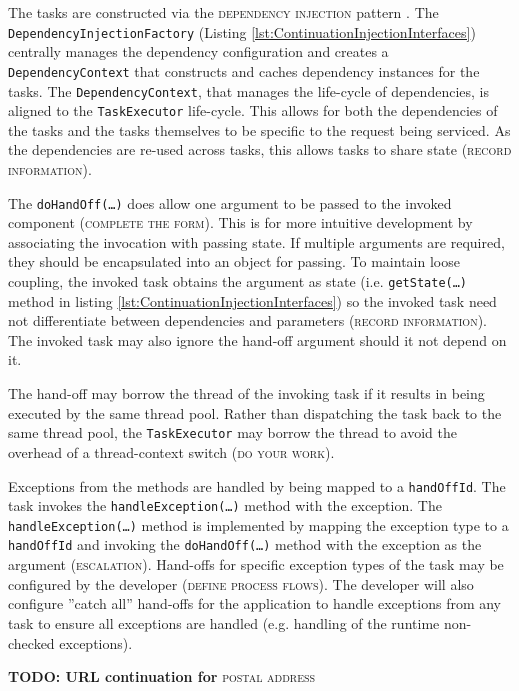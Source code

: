 \documentclass[prodmode]{style/acmlarge}
\begin{document}
The tasks are constructed via the \textsc{dependency injection} pattern
\cite{ioc}.  The \texttt{Dependency\-InjectionFactory} (Listing
\ref{lst:ContinuationInjectionInterfaces}) centrally manages the dependency
configuration and creates a \texttt{Depend\-ency\-Context} that constructs and
caches dependency instances for the tasks.  The \texttt{Dependency\-Context},
that manages the life-cycle of dependencies, is aligned to the
\texttt{TaskExecutor} life-cycle.  This allows for both the dependencies of the
tasks and the tasks themselves to be specific to the request being serviced.
As the dependencies are re-used across tasks, this allows tasks to share state
(\textsc{record information}).

The \texttt{doHandOff(\ldots)} does allow one argument to be passed to the
invoked component (\textsc{complete the form}).  This is for more intuitive
development by associating the invocation with passing state.  If multiple
arguments are required, they should be encapsulated into an object for passing.
To maintain loose coupling, the invoked task obtains the argument as state (i.e.
\texttt{getState(\ldots)} method in listing
\ref{lst:ContinuationInjectionInterfaces}) so the invoked task need not
differentiate between dependencies and parameters (\textsc{record information}).
The invoked task may also ignore the hand-off argument should it not depend on
it.

The hand-off may borrow the thread of the invoking task if it results in being
executed by the same thread pool.  Rather than dispatching the task back to the
same thread pool, the \texttt{TaskExecutor} may borrow the thread to avoid the
overhead of a thread-context switch (\textsc{do your work}).

Exceptions from the methods are handled by being mapped to a \texttt{handOffId}.
 The task invokes the \texttt{handle\-Excep\-tion(\ldots)} method with the
exception.  The \texttt{handleException(\ldots)} method is implemented by
mapping the exception type to a \texttt{handOffId} and invoking the
\texttt{doHandOff(\ldots)} method with the exception as the argument
(\textsc{escalation}).  Hand-offs for specific exception types of the task may
be configured by the developer (\textsc{define process flows}).  The developer
will also configure ''catch all'' hand-offs for the application to handle
exceptions from any task to ensure all exceptions are handled (e.g. handling of
the runtime non-checked exceptions).

\textbf{TODO: URL continuation for} \textsc{postal address}
\end{document}
